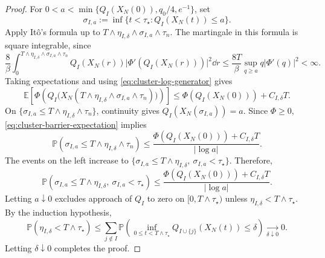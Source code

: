 \documentclass[11pt,reqno]{amsart}
\numberwithin{equation}{section}
\theoremstyle{plain}
\theoremstyle{remark}
\newcommand{\E}{\mathbb E}\newcommand{\Q}{\mathbb Q}\newcommand{\Pb}{\mathbb P}
\begin{document}
\begin{proof}
For $0<a<\min\{Q_I(X_N(0)),q_0/4,e^{-1}\}$, set
\begin{equation}\label{eq:cluster-hitting-time}
 \sigma_{I,a}:=\inf\{t<\tau_\star:Q_I(X_N(t))\le a\}.
\end{equation}
Apply It\^o's formula up to
$T\wedge\eta_{I,\delta}\wedge\sigma_{I,a}\wedge\tau_n$.
The martingale in this formula is square integrable, since
\begin{equation}\label{eq:cluster-stopped-martingale-bound}
 \frac8\beta\int_0^{T\wedge\eta_{I,\delta}\wedge\sigma_{I,a}\wedge\tau_n}
 Q_I(X_N(r))\bigl|\Phi'(Q_I(X_N(r)))\bigr|^2\dd r
 \le\frac{8T}\beta\sup_{q\ge a}q|\Phi'(q)|^2<\infty.
\end{equation}
Taking expectations and using \eqref{eq:cluster-log-generator} gives
\begin{equation}\label{eq:cluster-barrier-expectation}
 \E\!\left[\Phi\!\left(Q_I\bigl(X_N(T\wedge\eta_{I,\delta}\wedge\sigma_{I,a}\wedge\tau_n)\bigr)\right)\right]
 \le \Phi(Q_I(X_N(0)))+C_{I,\delta}T.
\end{equation}
On $\{\sigma_{I,a}\le T\wedge\eta_{I,\delta}\wedge\tau_n\}$, continuity gives
$Q_I(X_N(\sigma_{I,a}))=a$. Since $\Phi\ge0$, \eqref{eq:cluster-barrier-expectation} implies
\begin{equation}\label{eq:cluster-stopped-hitting-bound}
 \Pb(\sigma_{I,a}\le T\wedge\eta_{I,\delta}\wedge\tau_n)
 \le\frac{\Phi(Q_I(X_N(0)))+C_{I,\delta}T}{|\log a|}.
\end{equation}
The events on the left increase to
$\{\sigma_{I,a}\le T\wedge\eta_{I,\delta},\ \sigma_{I,a}<\tau_\star\}$.
Therefore,
\begin{equation}\label{eq:cluster-hitting-probability}
 \Pb(\sigma_{I,a}\le T\wedge\eta_{I,\delta},\ \sigma_{I,a}<\tau_\star)
 \le\frac{\Phi(Q_I(X_N(0)))+C_{I,\delta}T}{|\log a|}.
\end{equation}
Letting $a\downarrow0$ excludes approach of $Q_I$ to zero on
$[0,T\wedge\tau_\star)$ unless $\eta_{I,\delta}<T\wedge\tau_\star$.
By the induction hypothesis,
\begin{equation}\label{eq:cluster-exterior-stopping-vanishes}
 \Pb(\eta_{I,\delta}<T\wedge\tau_\star)
 \le\sum_{j\notin I}
 \Pb\!\left(\inf_{0\le t<T\wedge\tau_\star}
 Q_{I\cup\{j\}}(X_N(t))\le\delta\right)
 \xrightarrow[\delta\downarrow0]{}0.
\end{equation}
Letting $\delta\downarrow0$ completes the proof.
\end{proof}
\end{document}
